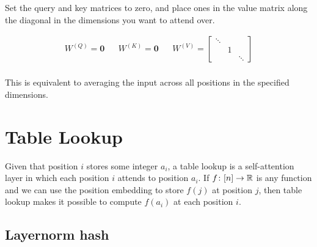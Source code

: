 Set the query and key matrices to zero, and place ones in the value matrix along the diagonal in the dimensions you want to attend over.

\begin{align*}
  W^{(Q)}=\textbf{0}
  &&
  W^{(K)}=\textbf{0}
  &&
  W^{(V)}=\begin{bmatrix}
    \ddots & & \\
    & 1 & \\
    & & \ddots
  \end{bmatrix}\\
\end{align*}

This is equivalent to averaging the input across all positions in the specified dimensions.

\section{Table Lookup}

Given that position $i$ stores some integer $a_i$, a table lookup is a self-attention layer in which each position $i$ attends to position $a_i$.
If $f \colon [n] \to \mathbb{R}$ is any function and we can use the position embedding to store $f(j)$ at position $j$, then table lookup makes it possible to compute $f(a_i)$ at each position $i$.

\iffalse
\subsection{Single query}

If every position has the same query ($q^{(i)} = q$ for all $i$) and there is a minimum distance $\delta$ between all keys ($|k^{(i)}-k^{(j)}| \ge \delta$ for all $i,j$), then we can just use a FFNN to compute $\mathbb{I}[k^{(i)} = q^{(i)}] \delta$, which is piecewise linear \citep{chiang-cholak-2022-parity}:
\begin{center}
  \begin{tikzpicture}
    \begin{axis}[xtick={-1,0,1},xticklabels={$-\delta$,$0$,$\delta$,ytick={0,1},yticklabels={$0$,$\delta$}}}]
      \addplot[mark=none] coordinates { (-5,0) (-1,0) (0,1) (1,0) (5,0) };
    \end{axis}
  \end{tikzpicture}
\end{center}
(Since this doesn't use attention, it doesn't strictly belong in this chapter.)
\fi

\subsection{Layernorm hash}

